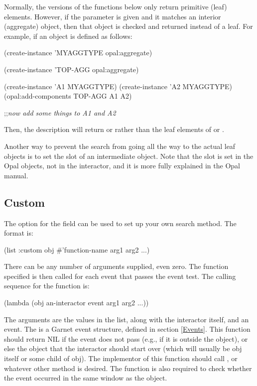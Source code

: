 Normally, the  versions of the functions below only return
primitive (leaf) elements.  However, if the  parameter is given
and it matches an interior (aggregate) object, then that object is checked
and returned instead of a leaf.   For example, if an object is defined as follows:
\begin{programexample}
(create-instance 'MYAGGTYPE opal:aggregate)

(create-instance 'TOP-AGG opal:aggregate)

(create-instance 'A1 MYAGGTYPE)
(create-instance 'A2 MYAGGTYPE)
(opal:add-components TOP-AGG A1 A2)

;;{\it now add some things to A1 and A2}
\end{programexample}
Then, the description 
will return  or  rather than the leaf elements of  or
.

Another way to prevent the search from going all the way to the actual leaf
objects is to set the  slot of an intermediate
object.  Note that the
 slot is set in the Opal objects, not in the
interactor, and it is more fully explained in the Opal manual.

\subsection{Custom}
\label{customwhere}
The  option for the  field can be used to set up
your own search method.  The format is:
\begin{programexample}
       (list :custom obj \#'function-name arg1 arg2 ...)
\end{programexample}
There can be any number of arguments supplied, even zero.  The function
specified is then called for each event that passes the event
test.  The calling sequence for the function is:
\begin{programexample}
	(lambda (obj an-interactor event arg1 arg2 ...))
\end{programexample}

The arguments are the values in the  list, along with the
interactor itself, and an event.
The  is a Garnet event structure, defined in section \ref{Events}.
This function should return NIL if the event does not pass (e.g., if it is
outside the object), or else the object that the interactor should start
over (which will usually be obj itself or some child of obj).  The
implementor of this function should call , or
whatever other method is desired.  The function is also required to check
whether the event occurred in the same window as the object.

